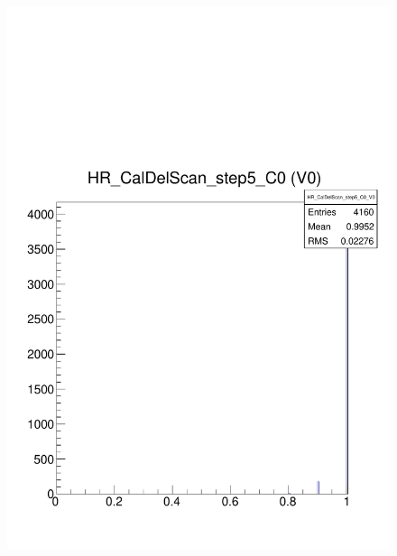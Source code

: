 \documentclass[a4paper,12pt,twoside]{article}
\begin{document}
\begin{figure} [h!]
\centering
\begin{minipage}{.48\textwidth}
  \centering
  \includegraphics[width=\textwidth]{./Figures/CalDel_Step5.pdf}
  \label{CalDel-Step5}
\end{minipage}%
\hspace{2mm}
\begin{minipage}{.48\textwidth}
  \centering

\end{minipage}
\end{figure}
\end{document}
